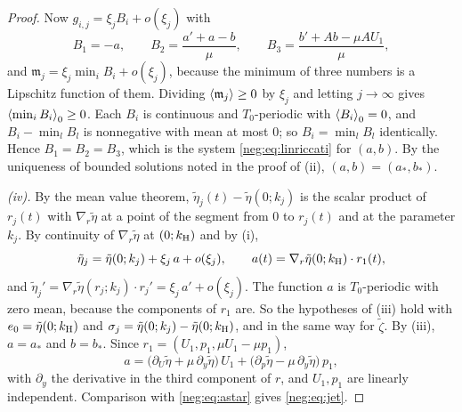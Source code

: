 \begin{proof}
Now $g_{i,j}=\xi_jB_i+o(\xi_j)$ with
\begin{equation}\label{neg:eq:brackets}
B_1=-a,\qquad B_2=\frac{a'+a-b}{\mu},\qquad B_3=\frac{b'+Ab-\mu AU_1}{\mu},
\end{equation}
and $\mathfrak m_j=\xi_j\min_iB_i+o(\xi_j)$, because the minimum of three numbers is a Lipschitz function of them. Dividing $\left\langle \mathfrak m_j\right\rangle\ge0$ by $\xi_j$ and letting $j\to\infty$ gives $\left\langle \min_iB_i\right\rangle_0\ge0$. Each $B_i$ is continuous and $T_0$-periodic with $\left\langle B_i\right\rangle_0=0$, and $B_i-\min_lB_l$ is nonnegative with mean at most $0$; so $B_i=\min_lB_l$ identically. Hence $B_1=B_2=B_3$, which is the system \eqref{neg:eq:linriccati} for $(a,b)$. By the uniqueness of bounded solutions noted in the proof of (ii), $(a,b)=(a_*,b_*)$.

\emph{(iv).} By the mean value theorem, $\tilde\eta_j(t)-\tilde\eta(0;k_j)$ is the scalar product of $r_j(t)$ with $\nabla_r\tilde\eta$ at a point of the segment from $0$ to $r_j(t)$ and at the parameter $k_j$. By continuity of $\nabla_r\tilde\eta$ at $(0;k_{\mathrm H})$ and by (i),
\[
\tilde\eta_j=\tilde\eta(0;k_j)+\xi_j\,a+o(\xi_j),\qquad a(t)=\nabla_r\tilde\eta(0;k_{\mathrm H})\cdot r_1(t),
\]
and $\tilde\eta_j'=\nabla_r\tilde\eta(r_j;k_j)\cdot r_j'=\xi_j\,a'+o(\xi_j)$. The function $a$ is $T_0$-periodic with zero mean, because the components of $r_1$ are. So the hypotheses of (iii) hold with $e_0=\tilde\eta(0;k_{\mathrm H})$ and $\sigma_j=\tilde\eta(0;k_j)-\tilde\eta(0;k_{\mathrm H})$, and in the same way for $\tilde\zeta$. By (iii), $a=a_*$ and $b=b_*$. Since $r_1=(U_1,p_1,\mu U_1-\mu p_1)$,
\[
a=\bigl(\partial_U\tilde\eta+\mu\,\partial_y\tilde\eta\bigr)\,U_1+\bigl(\partial_p\tilde\eta-\mu\,\partial_y\tilde\eta\bigr)\,p_1 ,
\]
with $\partial_y$ the derivative in the third component of $r$, and $U_1,p_1$ are linearly independent. Comparison with \eqref{neg:eq:astar} gives \eqref{neg:eq:jet}.
\end{proof}

